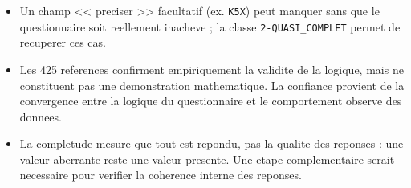 \documentclass[11pt,a4paper]{article}
\begin{document}
\begin{itemize}
  \item Un champ << preciser >> facultatif (ex. \texttt{K5X}) peut manquer
        sans que le questionnaire soit reellement inacheve ; la classe
        \texttt{2-QUASI\_COMPLET} permet de recuperer ces cas.
  \item Les 425 references confirment empiriquement la validite de la
        logique, mais ne constituent pas une demonstration mathematique. La
        confiance provient de la convergence entre la logique du
        questionnaire et le comportement observe des donnees.
  \item La completude mesure que tout est repondu, pas la qualite des
        reponses : une valeur aberrante reste une valeur presente. Une etape
        complementaire serait necessaire pour verifier la coherence interne
        des reponses.
\end{itemize}
\end{document}
